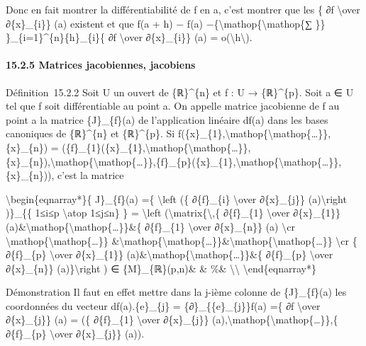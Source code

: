 \documentclass[]{article}
\begin{document}
Donc en fait montrer la différentiabilité de f en a, c'est montrer que
les \{ ∂f \textbackslash{}over ∂\{x\}\_\{i\}\} (a) existent et que f(a +
h) − f(a) −\{\textbackslash{}mathop\{\textbackslash{}mathop\{∑ \}\}
\}\_\{i=1\}\^{}\{n\}\{h\}\_\{i\}\{ ∂f \textbackslash{}over
∂\{x\}\_\{i\}\} (a) =
o(\textbackslash{}\textbar{}h\textbackslash{}\textbar{}).

\paragraph{15.2.5 Matrices jacobiennes, jacobiens}

Définition~15.2.2 Soit U un ouvert de \{ℝ\}\^{}\{n\} et f : U →
\{ℝ\}\^{}\{p\}. Soit a ∈ U tel que f soit différentiable au point a. On
appelle matrice jacobienne de f au point a la matrice \{J\}\_\{f\}(a) de
l'application linéaire df(a) dans les bases canoniques de \{ℝ\}\^{}\{n\}
et \{ℝ\}\^{}\{p\}. Si
f(\{x\}\_\{1\},\textbackslash{}mathop\{\textbackslash{}mathop\{\ldots{}\}\},\{x\}\_\{n\})
=
(\{f\}\_\{1\}(\{x\}\_\{1\},\textbackslash{}mathop\{\textbackslash{}mathop\{\ldots{}\}\},\{x\}\_\{n\}),\textbackslash{}mathop\{\textbackslash{}mathop\{\ldots{}\}\},\{f\}\_\{p\}(\{x\}\_\{1\},\textbackslash{}mathop\{\textbackslash{}mathop\{\ldots{}\}\},\{x\}\_\{n\})),
c'est la matrice

\textbackslash{}begin\{eqnarray*\}\{ J\}\_\{f\}(a) =\{
\textbackslash{}left (\{ ∂\{f\}\_\{i\} \textbackslash{}over
∂\{x\}\_\{j\}\} (a)\textbackslash{}right )\}\_\{\{ 1≤i≤p
\textbackslash{}atop 1≤j≤n\} \} = \textbackslash{}left
(\textbackslash{}matrix\{\textbackslash{},\{ ∂\{f\}\_\{1\}
\textbackslash{}over ∂\{x\}\_\{1\}\}
(a)\&\textbackslash{}mathop\{\textbackslash{}mathop\{\ldots{}\}\}\&\{
∂\{f\}\_\{1\} \textbackslash{}over ∂\{x\}\_\{n\}\} (a)
\textbackslash{}cr
\textbackslash{}mathop\{\textbackslash{}mathop\{\ldots{}\}\}
\&\textbackslash{}mathop\{\textbackslash{}mathop\{\ldots{}\}\}\&\textbackslash{}mathop\{\textbackslash{}mathop\{\ldots{}\}\}
\textbackslash{}cr \{ ∂\{f\}\_\{p\} \textbackslash{}over ∂\{x\}\_\{1\}\}
(a)\&\textbackslash{}mathop\{\textbackslash{}mathop\{\ldots{}\}\}\&\{
∂\{f\}\_\{p\} \textbackslash{}over ∂\{x\}\_\{n\}\}
(a)\}\textbackslash{}right ) ∈ \{M\}\_\{ℝ\}(p,n)\& \& \%\&
\textbackslash{}\textbackslash{} \textbackslash{}end\{eqnarray*\}

Démonstration Il faut en effet mettre dans la j-ième colonne de
\{J\}\_\{f\}(a) les coordonnées du vecteur df(a).\{e\}\_\{j\} =
\{∂\}\_\{\{e\}\_\{j\}\}f(a) =\{ ∂f \textbackslash{}over ∂\{x\}\_\{j\}\}
(a) = (\{ ∂\{f\}\_\{1\} \textbackslash{}over ∂\{x\}\_\{j\}\}
(a),\textbackslash{}mathop\{\textbackslash{}mathop\{\ldots{}\}\},\{
∂\{f\}\_\{p\} \textbackslash{}over ∂\{x\}\_\{j\}\} (a)).
\end{document}

